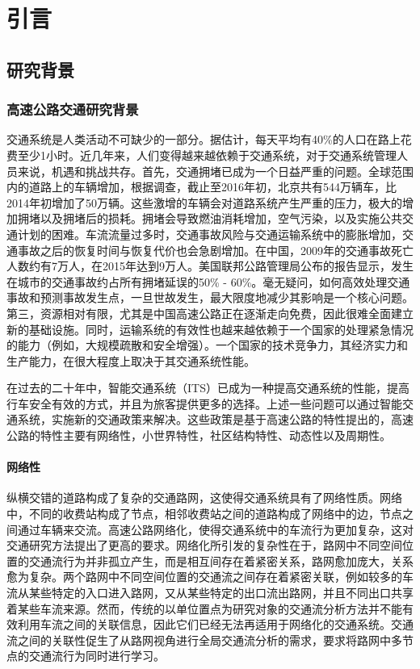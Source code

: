 
\chapter{引言}
\section{研究背景}
\subsection{高速公路交通研究背景}

交通系统是人类活动不可缺少的一部分。据估计，每天平均有40\%的人口在路上花费至少1小时。近几年来，人们变得越来越依赖于交通系统，对于交通系统管理人员来说，机遇和挑战共存。首先，交通拥堵已成为一个日益严重的问题。全球范围内的道路上的车辆增加，根据调查，截止至2016年初，北京共有544万辆车，比2014年初增加了50万辆。这些激增的车辆会对道路系统产生严重的压力，极大的增加拥堵以及拥堵后的损耗。拥堵会导致燃油消耗增加，空气污染，以及实施公共交通计划的困难。车流流量过多时，交通事故风险与交通运输系统中的膨胀增加，交通事故之后的恢复时间与恢复代价也会急剧增加。在中国，2009年的交通事故死亡人数约有7万人，在2015年达到9万人。美国联邦公路管理局公布的报告显示，发生在城市的交通事故约占所有拥堵延误的50\% - 60\%。毫无疑问，如何高效处理交通事故和预测事故发生点，一旦世故发生，最大限度地减少其影响是一个核心问题。第三，资源相对有限，尤其是中国高速公路正在逐渐走向免费，因此很难全面建立新的基础设施。同时，运输系统的有效性也越来越依赖于一个国家的处理紧急情况的能力（例如，大规模疏散和安全增强）。一个国家的技术竞争力，其经济实力和生产能力，在很大程度上取决于其交通系统性能。

			在过去的二十年中，智能交通系统（ITS）已成为一种提高交通系统的性能，提高行车安全有效的方式，并且为旅客提供更多的选择。上述一些问题可以通过智能交通系统，实施新的交通政策来解决。这些政策是基于高速公路的特性提出的，高速公路的特性主要有网络性，小世界特性，社区结构特性、动态性以及周期性。

\subsubsection{网络性}
    纵横交错的道路构成了复杂的交通路网，这使得交通系统具有了网络性质。网络中，不同的收费站构成了节点，相邻收费站之间的道路构成了网络中的边，节点之间通过车辆来交流。高速公路网络化，使得交通系统中的车流行为更加复杂，这对交通研究方法提出了更高的要求。网络化所引发的复杂性在于，路网中不同空间位置的交通流行为并非孤立产生，而是相互间存在着紧密关系，路网愈加庞大，关系愈为复杂。两个路网中不同空间位置的交通流之间存在着紧密关联，例如较多的车流从某些特定的入口进入路网，又从某些特定的出口流出路网，并且不同出口共享着某些车流来源。然而，传统的以单位置点为研究对象的交通流分析方法并不能有效利用车流之间的关联信息，因此它们已经无法再适用于网络化的交通系统。交通流之间的关联性促生了从路网视角进行全局交通流分析的需求，要求将路网中多节点的交通流行为同时进行学习。

